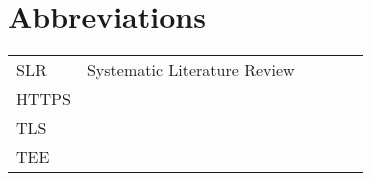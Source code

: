 \chapter*{Abbreviations}

\begin{flushleft}
\begin{tabular}{l p{0.8\linewidth}}
SLR      & Systematic Literature Review\\
HTTPS    & \\
TLS      & \\
TEE      & \\
\end{tabular}
\end{flushleft}
